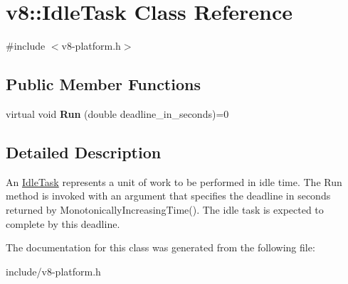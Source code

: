 \hypertarget{classv8_1_1_idle_task}{}\section{v8\+:\+:Idle\+Task Class Reference}
\label{classv8_1_1_idle_task}


{\ttfamily \#include $<$v8-\/platform.\+h$>$}

\subsection*{Public Member Functions}
\begin{DoxyCompactItemize}
\item 
virtual void {\bfseries Run} (double deadline\+\_\+in\+\_\+seconds)=0\hypertarget{classv8_1_1_idle_task_a4f2f238f551b3b2212adffcd5ee2f314}{}\label{classv8_1_1_idle_task_a4f2f238f551b3b2212adffcd5ee2f314}

\end{DoxyCompactItemize}


\subsection{Detailed Description}
An \hyperlink{classv8_1_1_idle_task}{Idle\+Task} represents a unit of work to be performed in idle time. The Run method is invoked with an argument that specifies the deadline in seconds returned by Monotonically\+Increasing\+Time(). The idle task is expected to complete by this deadline. 

The documentation for this class was generated from the following file\+:\begin{DoxyCompactItemize}
\item 
include/v8-\/platform.\+h\end{DoxyCompactItemize}
